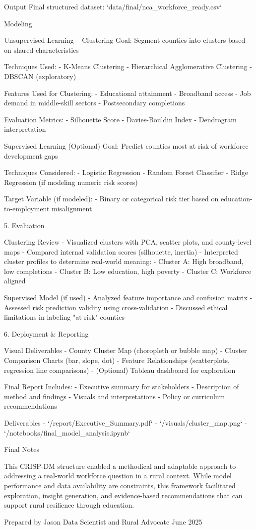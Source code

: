 Output
Final structured dataset:  
`data/final/nca_workforce_ready.csv`

Modeling

Unsupervised Learning – Clustering
Goal: Segment counties into clusters based on shared characteristics

Techniques Used:
- K-Means Clustering
- Hierarchical Agglomerative Clustering
- DBSCAN (exploratory)

Features Used for Clustering:
- Educational attainment
- Broadband access
- Job demand in middle-skill sectors
- Postsecondary completions

Evaluation Metrics:
- Silhouette Score
- Davies-Bouldin Index
- Dendrogram interpretation

Supervised Learning (Optional)
Goal: Predict counties most at risk of workforce development gaps

Techniques Considered:
- Logistic Regression
- Random Forest Classifier
- Ridge Regression (if modeling numeric risk scores)

Target Variable (if modeled):
- Binary or categorical risk tier based on education-to-employment misalignment

5. Evaluation

Clustering Review
- Visualized clusters with PCA, scatter plots, and county-level maps
- Compared internal validation scores (silhouette, inertia)
- Interpreted cluster profiles to determine real-world meaning:
  - Cluster A: High broadband, low completions  
  - Cluster B: Low education, high poverty  
  - Cluster C: Workforce aligned

Supervised Model (if used)
- Analyzed feature importance and confusion matrix
- Assessed risk prediction validity using cross-validation
- Discussed ethical limitations in labeling "at-risk" counties

6. Deployment & Reporting

Visual Deliverables
- County Cluster Map (choropleth or bubble map)
- Cluster Comparison Charts (bar, slope, dot)
- Feature Relationships (scatterplots, regression line comparisons)
- (Optional) Tableau dashboard for exploration

Final Report Includes:
- Executive summary for stakeholders
- Description of method and findings
- Visuals and interpretations
- Policy or curriculum recommendations

Deliverables
- `/report/Executive_Summary.pdf`
- `/visuals/cluster_map.png`
- `/notebooks/final_model_analysis.ipynb`

Final Notes

This CRISP-DM structure enabled a methodical and adaptable approach to addressing a real-world workforce question in a rural context. While model performance and data availability are constraints, this framework facilitated exploration, insight generation, and evidence-based recommendations that can support rural resilience through education.


Prepared by Jason  
Data Scientist and Rural Advocate  
June 2025
